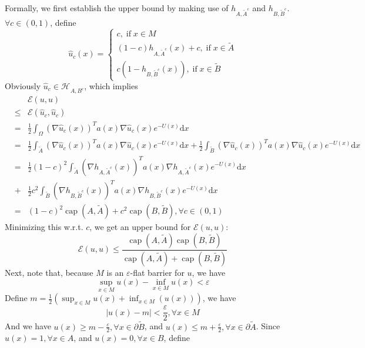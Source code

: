\documentclass[english, aip, jcp, priprint, graphicx]{revtex4-1}
\newcommand{\mathd}{\mathrm{d}}
\newcommand{\tmop}[1]{\ensuremath{\operatorname{#1}}}
\theoremstyle{plain}
\theoremstyle{definition}
\theoremstyle{plain}
\begin{document}
Formally, we first establish the upper bound by making use of $h_{A,
\tilde{A}^c}$ and $h_{B, \widetilde{B}^c}$. $\forall c \in (0, 1)$, define
\[ \hat{u}_c (x) = \left\{ \begin{array}{l}
c, \tmop{if} x \in M\\
(1 - c) h_{A, \widetilde{A}^c} (x) + c, \tmop{if} x \in \tilde{A}\\
c (1 - h_{B, \widetilde{B}^c} (x)), \tmop{if} x \in \tilde{B}
\end{array} \right. \]
Obviously $\hat{u}_c \in \mathcal{H_{}}_{A, B^c}$, which implies
\begin{eqnarray*}
&  & \mathcal{E} (u, u)\\
& \leqslant & \mathcal{E} (\hat{u}_c, \hat{u}_c)\\
& = & \frac{1}{2} \int_{\Omega} (\nabla \hat{u}_c (x))^T a (x)
\nabla \hat{u}_c (x) e^{- U (x)} \mathd x\\
& = & \frac{1}{2} \int_{\tilde{A}} (\nabla \hat{u}_c (x))^T a (x) \nabla
\hat{u}_c (x) e^{- U (x)} \mathd x + \frac{1}{2} \int_{\tilde{B}} (\nabla
\hat{u}_c (x))^T a (x) \nabla \hat{u}_c (x) e^{- U (x)} \mathd x\\
& = & \frac{1}{2} (1 - c)^2 \int_{\tilde{A}} (\nabla h_{A, \widetilde{A}^c}
(x))^T a (x) \nabla h_{A, \widetilde{A}^c} (x) e^{- U (x)} \mathd x\\
& + & \frac{1}{2} c^2 \int_{\tilde{B}} (\nabla h_{B, \widetilde{B}^c}
(x))^T a (x) \nabla h_{B, \widetilde{B}^c} (x) e^{- U (x)} \mathd x\\
& = & (1 - c)^2 \tmop{cap} (A, \tilde{A}) + c^2 \tmop{cap} (B, \tilde{B}),
\forall c \in (0, 1)
\end{eqnarray*}
Minimizing this w.r.t. $c$, we get an upper bound for $\mathcal{E} (u, u)$:
\[ \mathcal{E} (u, u) \leqslant \frac{\tmop{cap} (A, \tilde{A}) \tmop{cap} (B,
\tilde{B})}{\tmop{cap} (A, \tilde{A}) + \tmop{cap} (B, \tilde{B})} \]
Next, note that, because $M$ is an $\varepsilon$-flat barrier for $u$, we have
\[ \sup_{x \in M} u (x) - \inf_{x \in M} u (x) < \varepsilon \]
Define $m = \frac{1}{2} (\sup_{x \in M} u (x) + \inf_{x \in M} (u (x)))$, we have
\begin{equation}
\label{epsilonflat}
| u (x) - m | < \frac{\varepsilon}{2}, \forall x \in M 
\end{equation}
And we have $u (x) \geqslant m - \frac{\varepsilon}{2}, \forall x \in \partial \tilde{B}$, and $u (x) \leqslant m + \frac{\varepsilon}{2}, \forall x \in \partial \tilde{A}$. Since $u (x) = 1, \forall x \in A$, and $u (x) = 0, \forall x \in B$, define
\end{document}
